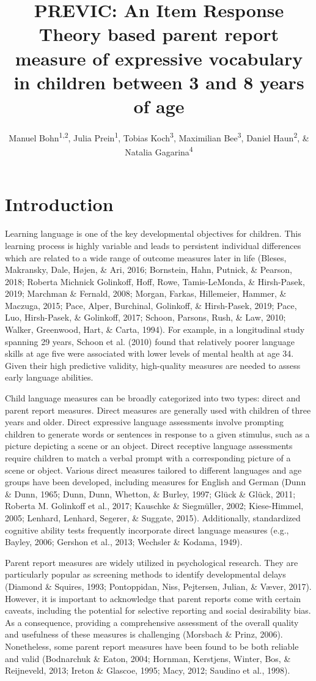 \documentclass[
  man,floatsintext]{apa6}
\title{PREVIC: An Item Response Theory based parent report measure of expressive vocabulary in children between 3 and 8 years of age}
\author{Manuel Bohn\textsuperscript{1,2}, Julia Prein\textsuperscript{1}, Tobias Koch\textsuperscript{3}, Maximilian Bee\textsuperscript{3}, Daniel Haun\textsuperscript{2}, \& Natalia Gagarina\textsuperscript{4}}
\date{}
\affiliation{\vspace{0.5cm}\textsuperscript{1} Institute for Psychology, Leuphana University Lüneburg, Germany\\\textsuperscript{2} Department of Comparative Cultural Psychology, Max Planck Institute for Evolutionary Anthropology, Leipzig, Germany\\\textsuperscript{3} Institut of Psychology, Friedrich-Schiller-University Jena, Germany\\\textsuperscript{4} Leibniz-Zentrum Allgemeine Sprachwissenschaft, Berlin, Germany}
\begin{document}
\maketitle

\hypertarget{introduction}{%
\section{Introduction}\label{introduction}}

Learning language is one of the key developmental objectives for children. This learning process is highly variable and leads to persistent individual differences which are related to a wide range of outcome measures later in life (Bleses, Makransky, Dale, Højen, \& Ari, 2016; Bornstein, Hahn, Putnick, \& Pearson, 2018; Roberta Michnick Golinkoff, Hoff, Rowe, Tamis-LeMonda, \& Hirsh-Pasek, 2019; Marchman \& Fernald, 2008; Morgan, Farkas, Hillemeier, Hammer, \& Maczuga, 2015; Pace, Alper, Burchinal, Golinkoff, \& Hirsh-Pasek, 2019; Pace, Luo, Hirsh-Pasek, \& Golinkoff, 2017; Schoon, Parsons, Rush, \& Law, 2010; Walker, Greenwood, Hart, \& Carta, 1994). For example, in a longitudinal study spanning 29 years, Schoon et al. (2010) found that relatively poorer language skills at age five were associated with lower levels of mental health at age 34. Given their high predictive validity, high-quality measures are needed to assess early language abilities.

Child language measures can be broadly categorized into two types: direct and parent report measures. Direct measures are generally used with children of three years and older. Direct expressive language assessments involve prompting children to generate words or sentences in response to a given stimulus, such as a picture depicting a scene or an object. Direct receptive language assessments require children to match a verbal prompt with a corresponding picture of a scene or object. Various direct measures tailored to different languages and age groups have been developed, including measures for English and German (Dunn \& Dunn, 1965; Dunn, Dunn, Whetton, \& Burley, 1997; Glück \& Glück, 2011; Roberta M. Golinkoff et al., 2017; Kauschke \& Siegmüller, 2002; Kiese-Himmel, 2005; Lenhard, Lenhard, Segerer, \& Suggate, 2015). Additionally, standardized cognitive ability tests frequently incorporate direct language measures (e.g., Bayley, 2006; Gershon et al., 2013; Wechsler \& Kodama, 1949).

Parent report measures are widely utilized in psychological research. They are particularly popular as screening methods to identify developmental delays (Diamond \& Squires, 1993; Pontoppidan, Niss, Pejtersen, Julian, \& Væver, 2017). However, it is important to acknowledge that parent reports come with certain caveats, including the potential for selective reporting and social desirability bias. As a consequence, providing a comprehensive assessment of the overall quality and usefulness of these measures is challenging (Morsbach \& Prinz, 2006). Nonetheless, some parent report measures have been found to be both reliable and valid (Bodnarchuk \& Eaton, 2004; Hornman, Kerstjens, Winter, Bos, \& Reijneveld, 2013; Ireton \& Glascoe, 1995; Macy, 2012; Saudino et al., 1998).
\end{document}
